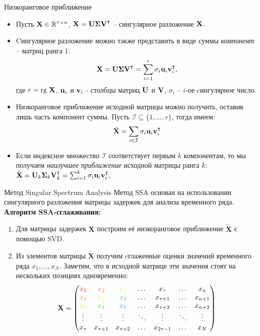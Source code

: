 \begin{frame}{Низкоранговое приближение}
    \begin{itemize}
        \item Пусть $\textbf{X} \in \mathbb{R}^{\tau \times n}$, $ \textbf{X} = \textbf{U} \boldsymbol{\Sigma} \textbf{V}^\intercal$ -- сингулярное разложение $\textbf{X}$.
        \item Cингулярное разложение можно также представить в виде суммы \textit{компонент} -- матриц ранга 1:
$$ \textbf{X} = \textbf{U} \boldsymbol{\Sigma} \textbf{V}^\intercal = \sum_{i = 1}^r \sigma_i \textbf{u}_i \textbf{v}_i^\intercal,$$
где $r = \text{rg}\  \textbf{X}$, $\textbf{u}_i$ и $\textbf{v}_i$ - столбцы матриц $\textbf{U}$ и $\textbf{V}$, $\sigma_i$ -- $i$-ое cингулярное число. 
        
        \item Низкоранговое приближение исходной матрицы можно получить, оставив лишь часть компонент суммы. Пусть $\mathcal{I} \subseteq \{1, ..., r\}$, тогда имеем:
        $$ \tilde{\textbf{X}} = \sum_{i \in \mathcal{I}} \sigma_i \textbf{u}_i \textbf{v}_i^\intercal$$
        
        \item Если индексное множество $\mathcal{I}$ соответствует первым $k$ компонентам, то мы получаем \textit{наилучшее приближение} исходной матрицы ранга $k$: $ \tilde{\textbf{X}} = \textbf{U}_k \boldsymbol{\Sigma}_k \textbf{V}_k^\intercal = \sum_{i = 1}^k \sigma_i \textbf{u}_i \textbf{v}_i^\intercal,$
        
    \end{itemize}

\end{frame}
\begin{frame}{Метод Singular Spectrum Analysis}
Метод SSA основан на использовании сингулярного разложения матрицы задержек для анализа временного ряда.\\
\textbf{Алгоритм SSA-сглаживания:}
\begin{enumerate}
    \item Для матрицы задержек $\mathbf{X}$ построим её низкоранговое приближение $\tilde{\mathbf{X}}$ с помощью SVD.
    \item Из элементов матрицы $\tilde{\mathbf{X}}$ получим cглаженные оценки значений временного ряда $x_1, ..., x_N$. Заметим, что в исходной матрице эти значения стоят на нескольких позициях одновременно:
    $$ \mathbf{X} = \begin{pmatrix}
    \textcolor{red}{x_1} & \textcolor{orange}{x_2} & \textcolor{yellow}{x_3} & \dots & x_{\tau} & \dots & x_n \\
    \textcolor{orange}{x_2} & \textcolor{yellow}{x_3} & \textcolor{green}{x_4} & \dots & x_{\tau + 1} & \dots & x_{n + 1} \\
    \textcolor{yellow}{x_3} & \textcolor{green}{x_4} & \textcolor{cyan}{x_5} & \dots & x_{\tau + 2} & \dots & x_{n + 2} \\
    \vdots & \vdots & \vdots & \ddots & \vdots & \ddots & \vdots \\
    x_{\tau} & x_{\tau + 1} & x_{\tau + 2} & \dots & x_{2\tau - 1} & \dots & x_N 
    \end{pmatrix} $$

\end{enumerate}

\end{frame}
